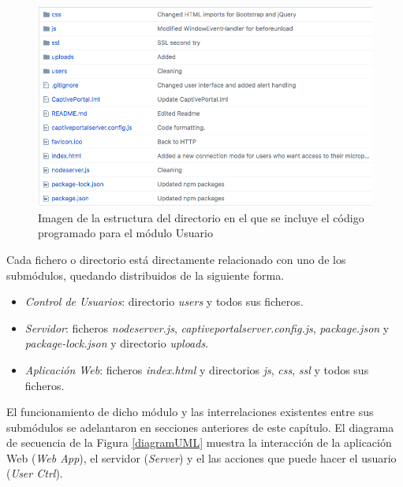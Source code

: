 \begin{figure}[!t]
\begin{center}
\includegraphics[width=0.75\linewidth]{./5_AnalisisOrganico/Img/repoGitHub.png}
\end{center}
\caption{Imagen de la estructura del directorio en el que se incluye el código programado para el módulo Usuario}
\label{repoGitHub}
\end{figure}

Cada fichero o directorio está directamente relacionado con uno de los submódulos, quedando distribuidos de la siguiente forma.

\begin{itemize}
\item \emph{Control de Usuarios}: directorio \emph{users} y todos sus ficheros.
\item \emph{Servidor}: ficheros \emph{nodeserver.js}, \emph{captiveportalserver.config.js}, \emph{package.json} y \emph{package-lock.json} y directorio \emph{uploads}.
\item \emph{Aplicación Web}: ficheros \emph{index.html} y directorios \emph{js}, \emph{css}, \emph{ssl} y todos sus ficheros.
\end{itemize}

El funcionamiento de dicho módulo y las interrelaciones existentes entre sus submódulos se adelantaron en secciones anteriores de este capítulo. El diagrama de secuencia de la Figura \ref{diagramUML} muestra la interacción de la aplicación Web (\emph{Web App}), el servidor (\emph{Server}) y el las acciones que puede hacer el usuario (\emph{User Ctrl}).


